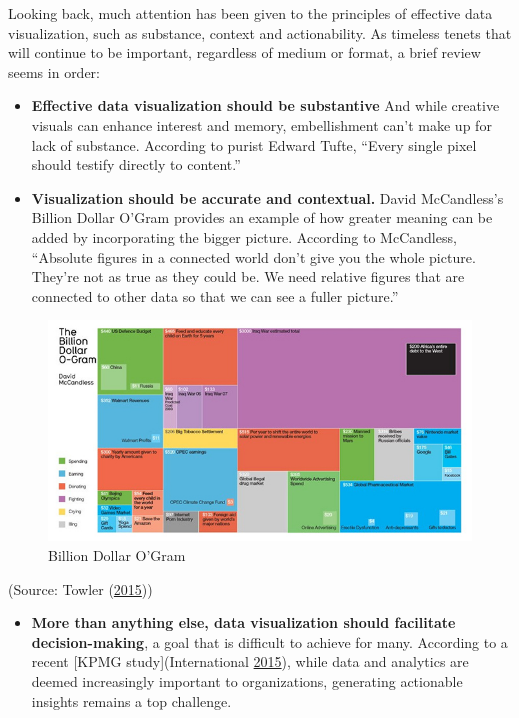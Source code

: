 \documentclass[]{book}
\providecommand{\tightlist}{%
  \setlength{\itemsep}{0pt}\setlength{\parskip}{0pt}}
\begin{document}
Looking back, much attention has been given to the principles of effective data visualization, such as substance, context and actionability. As timeless tenets that will continue to be important, regardless of medium or format, a brief review seems in order:

\begin{itemize}
\item
  \textbf{Effective data visualization should be substantive} And while creative visuals can enhance interest and memory, embellishment can't make up for lack of substance. According to purist Edward Tufte, ``Every single pixel should testify directly to content.''
\item
  \textbf{Visualization should be accurate and contextual.} David McCandless's Billion Dollar O'Gram provides an example of how greater meaning can be added by incorporating the bigger picture. According to McCandless, ``Absolute figures in a connected world don't give you the whole picture. They're not as true as they could be. We need relative figures that are connected to other data so that we can see a fuller picture.''
\end{itemize}

\begin{figure}
\centering
\includegraphics{images/BillionDollar.jpg}
\caption{Billion Dollar O'Gram}
\end{figure}

(Source: Towler (\protect\hyperlink{ref-future_viz}{2015}))

\begin{itemize}
\tightlist
\item
  \textbf{More than anything else, data visualization should facilitate decision-making}, a goal that is difficult to achieve for many. According to a recent {[}KPMG study{]}(International \protect\hyperlink{ref-kpmg}{2015}), while data and analytics are deemed increasingly important to organizations, generating actionable insights remains a top challenge.
\end{itemize}
\end{document}
